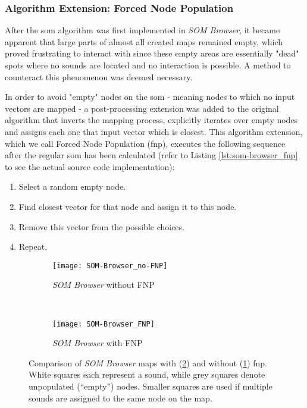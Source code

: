 \subsubsection{Algorithm Extension: Forced Node Population}
\label{subsubsec:som_forced_population}

After the \gls{som} algorithm was first implemented in \textit{SOM Browser}, it
became apparent that large parts of almost all created maps remained empty,
which proved frustrating to interact with since these empty areas are
essentially "dead" spots where no sounds are located and no interaction is
possible. A method to counteract this phenomenon was deemed necessary.

\smallskip

In order to avoid "empty" nodes on the \gls{som} - meaning nodes to which no
input vectors are mapped - a post-processing extension was added to the original
algorithm that inverts the mapping process, explicitly iterates over empty nodes
and assigns each one that input vector which is closest. This algorithm
extension, which we call Forced Node Population (\gls{fnp}), executes the
following sequence after the regular \gls{som} has been calculated (refer to
Listing \ref{lst:som-browser_fnp} to see the actual source code implementation):

\begin{enumerate}
  \item Select a random empty node.
  \item Find closest vector for that node and assign it to this node.
  \item Remove this vector from the possible choices.
  \item Repeat.
\end{enumerate}

\begin{figure}[!htb]
  \centering
\begin{subfigure}{0.45\textwidth}
  \centering
  \texttt{[image: SOM-Browser\_no-FNP]}
  \caption{\textit{SOM Browser} without FNP}
  \label{fig:som-browser_no_fnp}
\end{subfigure}
~
\begin{subfigure}{0.45\textwidth}
  \centering
  \texttt{[image: SOM-Browser\_FNP]}
  \caption{\textit{SOM Browser} with FNP}
  \label{fig:som-browser_fnp}
\end{subfigure}
\caption[Comparison of maps with (\ref{fig:som-browser_fnp}) and without
(\ref{fig:som-browser_no_fnp}) \gls{fnp}]
{Comparison of \textit{SOM Browser} maps with (\ref{fig:som-browser_fnp}) and
without (\ref{fig:som-browser_no_fnp}) \gls{fnp}. White squares each represent
a sound, while grey squares denote unpopulated (``empty'') nodes. Smaller
squares are used if multiple sounds are assigned to the same node on the map.}
\label{fig:som-browser_fnp_comparison}
\end{figure}

